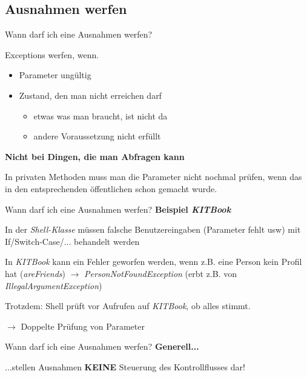 \documentclass[18pt]{beamer}
\begin{document}
\subsection*{Ausnahmen werfen}
\begin{frame}{Wann darf ich eine Ausnahmen werfen?}

	Exceptions werfen, wenn.
	\begin{itemize}
		\item Parameter ungültig
		\item Zustand, den man nicht erreichen darf
		\begin{itemize}
			\item etwas was man braucht, ist nicht da
			\item andere Voraussetzung nicht erfüllt
		\end{itemize}
	\end{itemize}
	
\textbf{Nicht bei Dingen, die man Abfragen kann}\pause

In privaten Methoden muss man die Parameter nicht nochmal prüfen, wenn das in den entsprechenden öffentlichen schon gemacht wurde.
\end{frame}


\begin{frame}{Wann darf ich eine Ausnahmen werfen?}
	\textbf{Beispiel \emph{KITBook}}
	
	In der \emph{Shell-Klasse} müssen falsche Benutzereingaben (Parameter fehlt usw) mit If/Switch-Case/... behandelt werden\pause
	
	In \emph{KITBook} kann ein Fehler geworfen werden, wenn z.B. eine Person kein Profil hat (\emph{areFriends}) $\rightarrow$ \emph{PersonNotFoundException} (erbt z.B. von \emph{IllegalArgumentException})\pause
	
	Trotzdem: Shell prüft vor Aufrufen auf \emph{KITBook}, ob alles stimmt.
	
	$\rightarrow$ Doppelte Prüfung von Parameter
	
\end{frame}

\begin{frame}{Wann darf ich eine Ausnahmen werfen?}
	\textbf{Generell...}
		
	...stellen Ausnahmen \textbf{KEINE} Steuerung des Kontrollflusses dar!
\end{frame}
\end{document}
